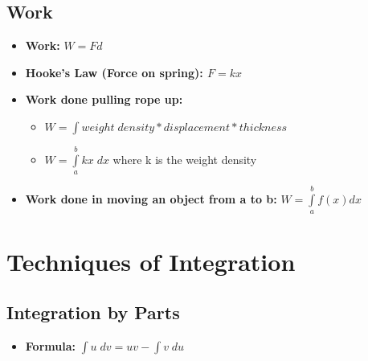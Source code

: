\documentclass{report}
\begin{document}
	\section{Work}
		\begin{itemize}\addtolength{\leftskip}{2em}
			\item \textbf{Work: }\large$W=Fd$
			\item \textbf{Hooke's Law (Force on spring): \large$F=kx$}
			\item \textbf{Work done pulling rope up:}
			\begin{itemize}\addtolength{\leftskip}{2em}
				\item \large$W=\int weight\;density * displacement * thickness$
				\item \large$W=\int\limits_{a}^{b}kx\;dx$ where k is the weight density
			\end{itemize}
			\item \textbf{Work done in moving an object from a to b:} $W=\int\limits_{a}^{b}f(x)dx$
		\end{itemize}
\chapter{Techniques of Integration}
	\section{Integration by Parts}
		\begin{itemize}\addtolength{\leftskip}{2em}
			\item \textbf{Formula: }\large$\int u\;dv=uv-\int v\;du$
		\end{itemize}
\end{document}
